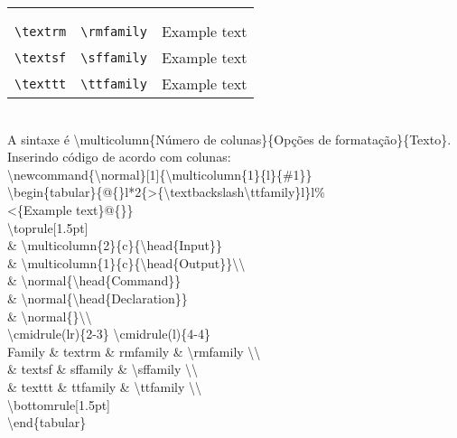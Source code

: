 \setlength{\abovetopsep}{10pt}
\setlength{\belowbottomsep}{10pt}

\begin{tabular}{@{}*3l@{}}
	\toprule[1.5pt]
	\multicolumn{2}{c}{\head{Input}} &
	\multicolumn{1}{c}{\head{Output}}\\
	\head{Command} & \head{Declaration} & \\
	\cmidrule(r){1-2}\cmidrule(l){3-3}
	\verb|\textrm| & \verb|\rmfamily| & \rmfamily Example text\\
	\verb|\textsf| & \verb|\sffamily| & \sffamily Example text\\
	\verb|\texttt| & \verb|\ttfamily| & \ttfamily Example text\\
	\bottomrule[1.5pt]
\end{tabular}
\\

A sintaxe é \textbackslash multicolumn\{Número de colunas\}\{Opções de formatação\}\{Texto\}.\\

Inserindo código de acordo com colunas:\\

\ttfamily
\noindent\textbackslash newcommand\{\textbackslash normal\}[1]\{\textbackslash multicolumn\{1\}\{l\}\{\#1\}\}\\
\textbackslash begin\{tabular\}\{@\{\}l*2\{>\{\textbackslash textbackslash\textbackslash ttfamily\}l\}l\%\\
    <\{Example text\}@\{\}\}\\
    \textbackslash toprule[1.5pt]\\
    \& \textbackslash multicolumn\{2\}\{c\}\{\textbackslash head\{Input\}\}\\
    \& \textbackslash multicolumn\{1\}\{c\}\{\textbackslash head\{Output\}\}\textbackslash \textbackslash \\
    \& \textbackslash normal\{\textbackslash head\{Command\}\}\\
    \& \textbackslash normal\{\textbackslash head\{Declaration\}\}\\
    \& \textbackslash normal\{\}\textbackslash \textbackslash \\
    \textbackslash cmidrule(lr)\{2-3\} \textbackslash cmidrule(l)\{4-4\}\\
    Family \& textrm \& rmfamily \& \textbackslash rmfamily \textbackslash \textbackslash \\
    \& textsf \& sffamily \& \textbackslash sffamily \textbackslash \textbackslash \\
    \& texttt \& ttfamily \& \textbackslash ttfamily \textbackslash \textbackslash \\
    \textbackslash bottomrule[1.5pt]\\
\textbackslash end\{tabular\}
\\
\sffamily

